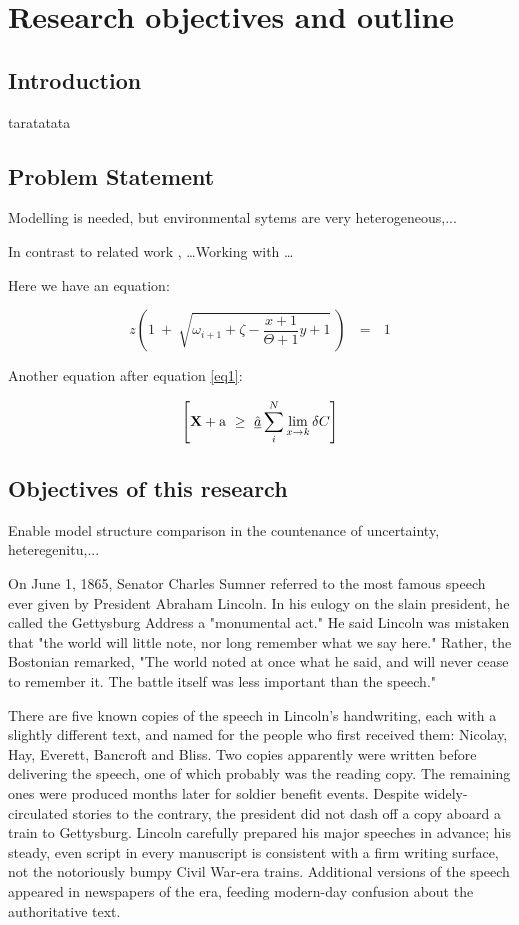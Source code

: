 \chapter[Research objectives]%
{Research objectives and outline}

\section{Introduction}
taratatata


\section{Problem Statement}
Modelling is needed, but environmental sytems are very heterogeneous,...

In contrast to related work \citep{Refsgaard2007}, \ldots  Working with \citet{Refsgaard2007} \ldots

Here we have an equation: 

\begin{equation}
z \left( 1 \ +\ \sqrt{\omega_{i+1} + \zeta -\frac{x+1}{\Theta +1} y + 1}
\ \right)
\ \ \ =\ \ \ 1
\label{eq1}
\end{equation}

Another equation after equation \ref{eq1}:

\begin{equation}
\left[
{\bf X} + {\rm a} \ \geq\
\underline{\hat a}  \sum_i^N \lim_{x \rightarrow k} \delta C
\right]
\end{equation}

\section{Objectives of this research}
Enable model structure comparison in the countenance of uncertainty, heteregenitu,... 

 On June 1, 1865, Senator Charles Sumner referred to the most famous speech ever given by President Abraham Lincoln. In his eulogy on the slain president, he called the Gettysburg Address a "monumental act." He said Lincoln was mistaken that "the world will little note, nor long remember what we say here." Rather, the Bostonian remarked, "The world noted at once what he said, and will never cease to remember it. The battle itself was less important than the speech."

There are five known copies of the speech in Lincoln's handwriting, each with a slightly different text, and named for the people who first received them: Nicolay, Hay, Everett, Bancroft and Bliss. Two copies apparently were written before delivering the speech, one of which probably was the reading copy. The remaining ones were produced months later for soldier benefit events. Despite widely-circulated stories to the contrary, the president did not dash off a copy aboard a train to Gettysburg. Lincoln carefully prepared his major speeches in advance; his steady, even script in every manuscript is consistent with a firm writing surface, not the notoriously bumpy Civil War-era trains. Additional versions of the speech appeared in newspapers of the era, feeding modern-day confusion about the authoritative text. 


